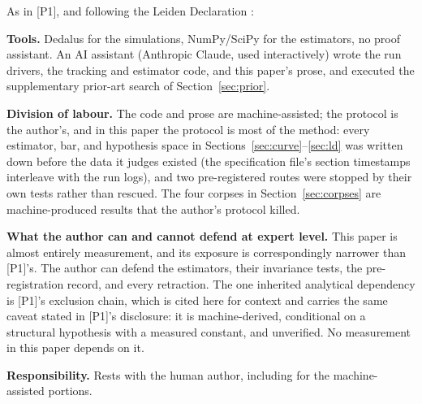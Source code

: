 \documentclass[11pt]{article}
\begin{document}
As in [P1], and following the Leiden Declaration \cite{Leiden26}:

\textbf{Tools.} Dedalus for the simulations, NumPy/SciPy for the
estimators, no proof assistant. An AI assistant (Anthropic Claude, used
interactively) wrote the run drivers, the tracking and estimator code,
and this paper's prose, and executed the supplementary prior-art search
of Section~\ref{sec:prior}.

\textbf{Division of labour.} The code and prose are machine-assisted;
the protocol is the author's, and in this paper the protocol is most of
the method: every estimator, bar, and hypothesis space in
Sections~\ref{sec:curve}--\ref{sec:ld} was written down before the data
it judges existed (the specification file's section timestamps
interleave with the run logs), and two pre-registered routes were
stopped by their own tests rather than rescued. The four corpses in
Section~\ref{sec:corpses} are machine-produced results that the author's
protocol killed.

\textbf{What the author can and cannot defend at expert level.} This
paper is almost entirely measurement, and its exposure is
correspondingly narrower than [P1]'s. The author can defend the
estimators, their invariance tests, the pre-registration record, and
every retraction. The one inherited analytical dependency is [P1]'s
exclusion chain, which is cited here for context and carries the same
caveat stated in [P1]'s disclosure: it is machine-derived, conditional
on a structural hypothesis with a measured constant, and unverified.
No measurement in this paper depends on it.

\textbf{Responsibility.} Rests with the human author, including for the
machine-assisted portions.
\end{document}
